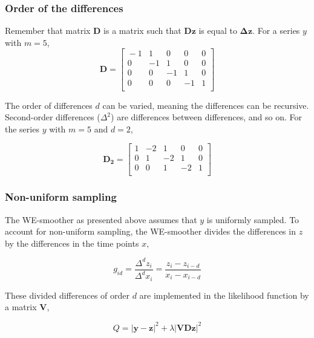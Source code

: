 \documentclass[twocolumn]{bmcart}%
\begin{document}
\subsubsection*{Order of the differences}
Remember that matrix $\mathbf{D}$ is a matrix such that $\mathbf{Dz}$ is equal to $\mathbf{\Delta z}$.
For a series $y$ with $m=5$,   
\[
\mathbf{D} =
\begin{bmatrix}{}
  -1 & 1 & 0 & 0 & 0 \\ 
  0 & -1 & 1 & 0 & 0 \\ 
  0 & 0 & -1 & 1 & 0 \\ 
  0 & 0 & 0 & -1 & 1 \\ 
  \end{bmatrix}
  \]
  


The order of differences $d$ can be varied, meaning the differences can be recursive. 
Second-order differences ($\Delta^2$) are differences between differences, and so on. 
For the series $y$ with $m=5$ and $d=2$, 

\[
\mathbf{D_2} =
\begin{bmatrix}{}
  1 & -2 & 1 & 0 & 0 \\ 
  0 & 1 & -2 & 1 & 0 \\ 
  0 & 0 & 1 & -2 & 1 \\ 
  \end{bmatrix}
  \]

\subsubsection*{Non-uniform sampling}
The WE-smoother as presented above assumes that $y$ is uniformly sampled.
To account for non-uniform sampling, the WE-smoother divides the differences in $z$ by the differences in the time points $x$, 

\begin{equation}
    g_{id} = \frac{\Delta^d z_i}{\Delta^d x_i} = \frac{z_i - z_{i-d}}{x_i - x_{i-d}}
\end{equation}

These divided differences of order $d$ are implemented in the likelihood function by a matrix $\mathbf{V}$,

\begin{equation}
Q = |\mathbf{y - z}|^2 + \lambda|\mathbf{VDz}|^2
\label{eq:likelihood}
\end{equation}
\end{document}
